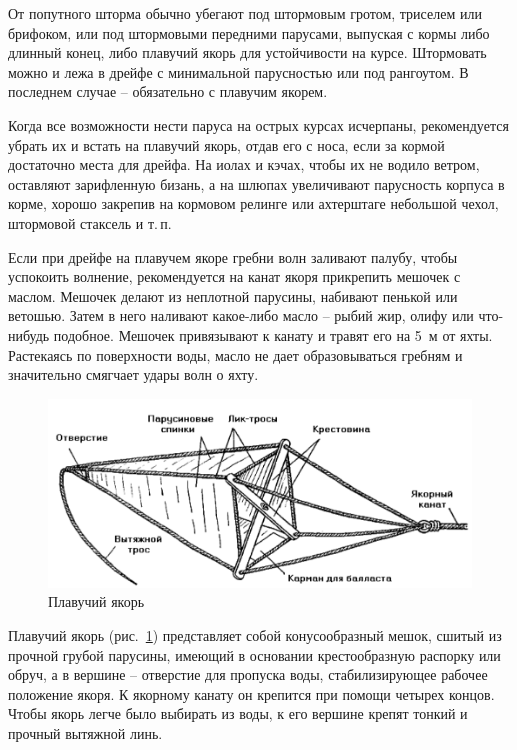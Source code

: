 \documentclass[a4paper, 12pt, twoside, final]{scrbook}
\begin{document}
От попутного шторма обычно убегают под штормовым гротом, триселем или брифоком, или под штормовыми передними парусами, выпуская с кормы либо длинный конец, либо плавучий якорь для устойчивости на курсе. Штормовать можно и лежа в дрейфе с минимальной парусностью или под рангоутом. В последнем случае \--- обязательно с плавучим якорем.

Когда все возможности нести паруса на острых курсах исчерпаны, рекомендуется убрать их и встать на плавучий якорь, отдав его с носа, если за кормой достаточно места для дрейфа. На иолах и кэчах, чтобы их не водило ветром, оставляют зарифленную бизань, а на шлюпах увеличивают парусность корпуса в корме, хорошо закрепив на кормовом релинге или ахтерштаге небольшой чехол, штормовой стаксель и т.\,п.

Если при дрейфе на плавучем якоре гребни волн заливают палубу, чтобы успокоить волнение, рекомендуется на канат якоря прикрепить мешочек с маслом. Мешочек делают из неплотной парусины, набивают пенькой или ветошью. Затем в него наливают какое-либо масло \--- рыбий жир, олифу или что-нибудь подобное. Мешочек привязывают к канату и травят его на 5~м от яхты. Растекаясь по поверхности воды, масло не дает образовываться гребням и значительно смягчает удары волн о яхту.

\begin{figure}[htbp]
   \centering
   \includegraphics{pics/117_Plav_yakor} %
   \caption{Плавучий якорь}
   \label{fig:117}
\end{figure}

Плавучий якорь (рис.~\ref{fig:117}) представляет собой конусообразный мешок, сшитый из прочной грубой парусины, имеющий в основании крестообразную распорку или обруч, а в вершине \--- отверстие для пропуска воды, стабилизирующее рабочее положение якоря. К якорному канату он крепится при помощи четырех концов. Чтобы якорь легче было выбирать из воды, к его вершине крепят тонкий и прочный вытяжной линь. 
\end{document}

